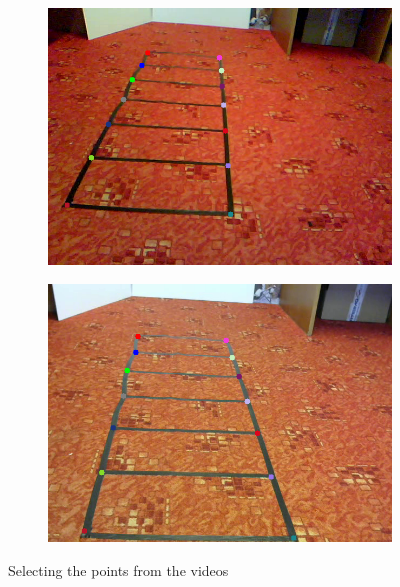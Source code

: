 \begin{figure}
\centering
\begin{subfigure}{0.48\linewidth}
	\includegraphics[width=\linewidth]{img/experiments/left-ladder.png}
\end{subfigure}
\begin{subfigure}{0.48\linewidth}
	\includegraphics[width=\linewidth]{img/experiments/right-ladder.png}
\end{subfigure}
\caption{Selecting the points from the videos}
\label{fig:ladder_ground}
\end{figure}

